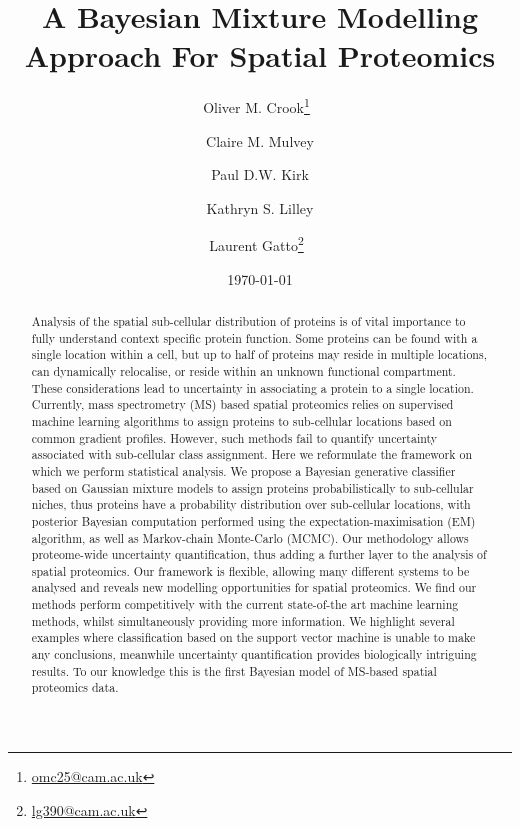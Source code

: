 \documentclass[12pt,english]{article}\usepackage[]{graphicx}\usepackage[]{color}
\begin{document}
\author[1,2,3]{Oliver M. Crook\thanks{\url{omc25@cam.ac.uk}}~}
\author[2]{Claire M. Mulvey}
\author[3]{Paul D.W. Kirk}
\author[2]{Kathryn S. Lilley}
\author[1,2]{Laurent Gatto\thanks{\url{lg390@cam.ac.uk}}~}





\title{A Bayesian Mixture Modelling Approach For Spatial Proteomics}

\date{\small \today}

\maketitle
\linenumbers
\begin{abstract}
  Analysis of the spatial sub-cellular distribution of proteins is of
  vital importance to fully understand context specific protein
  function. Some proteins can be found with a single location within a
  cell, but up to half of proteins may reside in multiple locations,
  can dynamically relocalise, or reside within an unknown functional
  compartment. These considerations lead to uncertainty in associating
  a protein to a single location. Currently, mass spectrometry (MS)
  based spatial proteomics relies on supervised machine learning
  algorithms to assign proteins to sub-cellular locations based on
  common gradient profiles. However, such methods fail to quantify
  uncertainty associated with sub-cellular class assignment. Here we
  reformulate the framework on which we perform statistical
  analysis. We propose a Bayesian generative classifier based on
  Gaussian mixture models to assign proteins probabilistically to
  sub-cellular niches, thus proteins have a probability distribution
  over sub-cellular locations, with posterior Bayesian computation
  performed using the expectation-maximisation (EM) algorithm, as well
  as Markov-chain Monte-Carlo (MCMC). Our methodology allows
  proteome-wide uncertainty quantification, thus adding a further
  layer to the analysis of spatial proteomics. Our framework is
  flexible, allowing many different systems to be analysed and reveals
  new modelling opportunities for spatial proteomics. We find our
  methods perform competitively with the current state-of-the art
  machine learning methods, whilst simultaneously providing more
  information. We highlight several examples where classification
  based on the support vector machine is unable to make any
  conclusions, meanwhile uncertainty quantification provides
  biologically intriguing results.  To our knowledge this is the first
  Bayesian model of MS-based spatial proteomics data.
\end{abstract}
\end{document}
